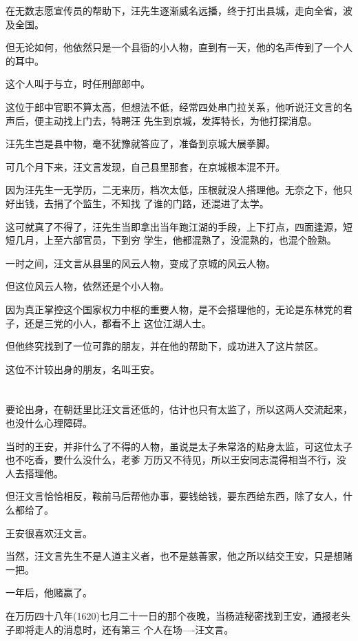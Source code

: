 \documentclass[11pt,a4paper,onecolumn]{article}
\begin{document}
在无数志愿宣传员的帮助下，汪先生逐渐威名远播，终于打出县城，走向全省，波及全国。

但无论如何，他依然只是一个县衙的小人物，直到有一天，他的名声传到了一个人的耳中。

这个人叫于与立，时任刑部郎中。

这位于郎中官职不算太高，但想法不低，经常四处串门拉关系，他听说汪文言的名声后，便主动找上门去，特聘汪
先生到京城，发挥特长，为他打探消息。

汪先生岂是县中物，毫不犹豫就答应了，准备到京城大展拳脚。

可几个月下来，汪文言发现，自己县里那套，在京城根本混不开。

因为汪先生一无学历，二无来历，档次太低，压根就没人搭理他。无奈之下，他只好出钱，去捐了个监生，不知找
了谁的门路，还混进了太学。

这可就真了不得了，汪先生当即拿出当年跑江湖的手段，上下打点，四面逢源，短短几月，上至六部官员，下到穷
学生，他都混熟了，没混熟的，也混个脸熟。

一时之间，汪文言从县里的风云人物，变成了京城的风云人物。

但这位风云人物，依然还是个小人物。

因为真正掌控这个国家权力中枢的重要人物，是不会搭理他的，无论是东林党的君子，还是三党的小人，都看不上
这位江湖人士。

但他终究找到了一位可靠的朋友，并在他的帮助下，成功进入了这片禁区。

这位不计较出身的朋友，名叫王安。

\section[\thesection]{}

要论出身，在朝廷里比汪文言还低的，估计也只有太监了，所以这两人交流起来，也没什么心理障碍。

当时的王安，并非什么了不得的人物，虽说是太子朱常洛的贴身太监，可这位太子也不吃香，要什么没什么，老爹
万历又不待见，所以王安同志混得相当不行，没人去搭理他。

但汪文言恰恰相反，鞍前马后帮他办事，要钱给钱，要东西给东西，除了女人，什么都给了。

王安很喜欢汪文言。

当然，汪文言先生不是人道主义者，也不是慈善家，他之所以结交王安，只是想赌一把。

一年后，他赌赢了。

在万历四十八年(1620)七月二十一日的那个夜晚，当杨涟秘密找到王安，通报老头子即将走人的消息时，还有第三
个人在场----汪文言。
\end{document}
